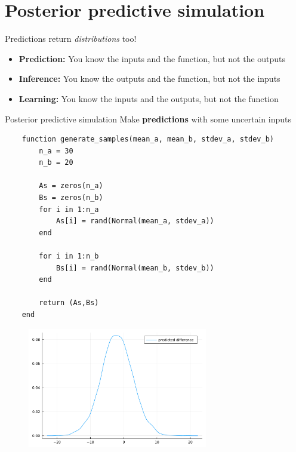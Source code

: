 \documentclass[aspectratio=169,xcolor=svgnames]{beamer}
\begin{document}
\section{Posterior predictive simulation}

\begin{frame}
  \huge
  \center
  Predictions return \emph{distributions} too!
\end{frame}

\begin{frame}
  \begin{itemize}
  \item \textbf{Prediction:} You know the inputs and the function, but not the outputs
  \item \textbf{Inference:} You know the outputs and the function, but not the inputs
  \item \textbf{Learning:} You know the inputs and the outputs, but not the function
  \end{itemize}

  \begin{block}{Posterior predictive simulation}
    Make \textbf{predictions} with some uncertain inputs
  \end{block}
\end{frame}

\begin{frame}[fragile]
    \begin{verbatim}
    function generate_samples(mean_a, mean_b, stdev_a, stdev_b)
        n_a = 30
        n_b = 20

        As = zeros(n_a)
        Bs = zeros(n_b)
        for i in 1:n_a
            As[i] = rand(Normal(mean_a, stdev_a))
        end

        for i in 1:n_b
            Bs[i] = rand(Normal(mean_b, stdev_b))
        end

        return (As,Bs)
    end
    \end{verbatim}
\end{frame}

\begin{frame}
\begin{figure}[ht]
  \centering
  \includegraphics[width=0.7\textwidth]{figures/predicted_difference_a_b.pdf}
\end{figure}
\end{frame}
\end{document}
